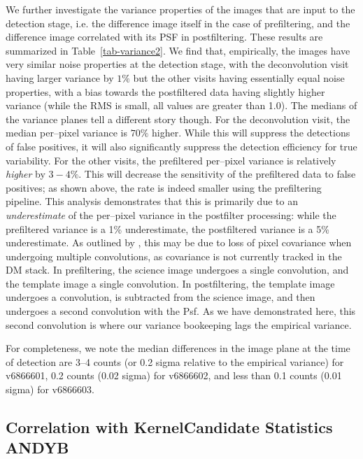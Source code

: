 \documentclass[prd, nofootinbib, floatfix, 11pt,tightenlines,times]{article}
\begin{document}
We further investigate the variance properties of the images that are
input to the detection stage, i.e. the difference image itself in the
case of prefiltering, and the difference image correlated with its PSF
in postfiltering.  These results are summarized in
Table~\ref{tab-variance2}.  We find that, empirically, the images have
very similar noise properties at the detection stage, with the
deconvolution visit having larger variance by $1\%$ but the other
visits having essentially equal noise properties, with a bias towards
the postfiltered data having slightly higher variance (while the RMS
is small, all values are greater than 1.0).  The medians of the
variance planes tell a different story though.  For the deconvolution
visit, the median per--pixel variance is $70\%$ higher.  While this
will suppress the detections of false positives, it will also
significantly suppress the detection efficiency for true variability.
For the other visits, the prefiltered per--pixel variance is
relatively {\it higher} by $3-4\%$.  This will decrease the
sensitivity of the prefiltered data to false positives; as shown
above, the rate is indeed smaller using the prefiltering pipeline.
This analysis demonstrates that this is primarily due to an {\it
  underestimate} of the per--pixel variance in the postfilter
processing: while the prefiltered variance is a 1\% underestimate, the
postfiltered variance is a 5\% underestimate.  As outlined by
\cite{Price-Stacking}, this may be due to loss of pixel covariance
when undergoing multiple convolutions, as covariance is not currently
tracked in the DM stack.  In prefiltering, the science image undergoes
a single convolution, and the template image a single convolution.  In
postfiltering, the template image undergoes a convolution, is
subtracted from the science image, and then undergoes a second
convolution with the Psf.  As we have demonstrated here, this second
convolution is where our variance bookeeping lags the empirical
variance.

For completeness, we note the median differences in the image plane at
the time of detection are 3--4 counts (or 0.2 sigma relative to the
empirical variance) for v6866601, 0.2 counts (0.02 sigma) for
v6866602, and less than 0.1 counts (0.01 sigma) for v6866603.

\subsection{Correlation with KernelCandidate Statistics {\bf ANDYB}}
\end{document}

